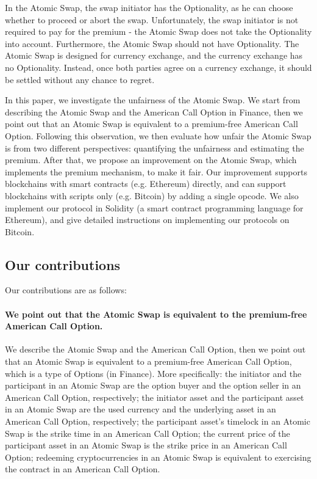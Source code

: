 In the Atomic Swap, the swap initiator has the Optionality, as he can choose whether to proceed or abort the swap.
Unfortunately, the swap initiator is not required to pay for the premium - the Atomic Swap does not take the Optionality into account.
Furthermore, the Atomic Swap should not have Optionality.
The Atomic Swap is designed for currency exchange, and the currency exchange has no Optionality.
Instead, once both parties agree on a currency exchange, it should be settled without any chance to regret.

In this paper, we investigate the unfairness of the Atomic Swap.
We start from describing the Atomic Swap and the American Call Option in Finance,
then we point out that an Atomic Swap is equivalent to a premium-free American Call Option.
Following this observation, we then evaluate how unfair the Atomic Swap is from two different perspectives:
quantifying the unfairness and estimating the premium.
After that, we propose an improvement on the Atomic Swap, which implements the premium mechanism, to make it fair.
Our improvement supports blockchains with smart contracts (e.g. Ethereum) directly, and can support blockchains with scripts only (e.g. Bitcoin) by adding a single opcode.
We also implement our protocol in Solidity (a smart contract programming language for Ethereum), and give detailed instructions on implementing our protocols on Bitcoin.

\subsection{Our contributions}

Our contributions are as follows:

\paragraph{We point out that the Atomic Swap is equivalent to the premium-free American Call Option.}
We describe the Atomic Swap and the American Call Option,
then we point out that an Atomic Swap is equivalent to a premium-free American Call Option, which is a type of Options (in Finance).
More specifically:
the initiator and the participant in an Atomic Swap are the option buyer and the option seller in an American Call Option, respectively;
the initiator asset and the participant asset in an Atomic Swap are the used currency and the underlying asset in an American Call Option, respectively;
the participant asset's timelock in an Atomic Swap is the strike time in an American Call Option;
the current price of the participant asset in an Atomic Swap is the strike price in an American Call Option;
redeeming cryptocurrencies in an Atomic Swap is equivalent to exercising the contract in an American Call Option.

